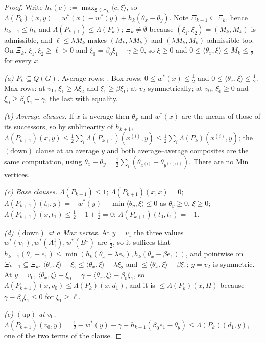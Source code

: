 \documentclass[11pt]{article}
\theoremstyle{plain}
\theoremstyle{definition}
\begin{document}
\begin{proof}
Write $h_k(c):=\max_{\xi\in\Xi_k}\langle c,\xi\rangle$, so
$\Lambda(P_k)(x,y)=w^\ast(x)-w^\ast(y)+h_k(\theta_x-\theta_y)$. Note
$\Xi_{k+1}\subseteq\Xi_k$, hence $h_{k+1}\le h_k$ and
$\Lambda(P_{k+1})\le\Lambda(P_k)$; $\Xi_k\ne\emptyset$ because
$(\xi_1,\xi_2)=(M_k,M_k)$ is admissible, and $\ell\le\lambda M_k$ makes
$(M_k,\lambda M_k)$ and $(\lambda M_k,M_k)$ admissible too. On $\Xi_k$,
$\xi_1,\xi_2\ge\ell>0$ and $\xi_0=\beta_0\xi_1-\gamma\ge0$, so $\xi\ge0$ and
$0\le\langle\theta_x,\xi\rangle\le M_k\le\tfrac12$ for every $x$.

\emph{(a) $P_k\subseteq Q(G)$.} Average rows: . Box rows:
$0\le w^\ast(x)\le\tfrac12$ and $0\le\langle\theta_x,\xi\rangle\le\tfrac12$.
Max rows: at $v_1$, $\xi_1\ge\lambda\xi_2$ and $\xi_1\ge\beta\xi_1$; at $v_2$
symmetrically; at $v_0$, $\xi_0\ge0$ and $\xi_0\ge\beta_0\xi_1-\gamma$, the
last with equality.

\emph{(b) Average clauses.} If $x$ is average then $\theta_x$ and $w^\ast(x)$
are the means of those of its successors, so by sublinearity of $h_{k+1}$,
$\Lambda(P_{k+1})(x,y)\le\tfrac12\sum_i\Lambda(P_{k+1})(x^{(i)},y)
\le\tfrac12\sum_i\Lambda(P_k)(x^{(i)},y)$; the $(\mathrm{down})$ clause at an
average $y$ and both average--average composites are the same computation,
using $\theta_x-\theta_y=\tfrac12\sum_i(\theta_{x^{(i)}}-\theta_{y^{(\pi(i))}})$.
There are no Min vertices.

\emph{(c) Base clauses.} $\Lambda(P_{k+1})\le1$;
$\Lambda(P_{k+1})(x,x)=0$;
$\Lambda(P_{k+1})(t_0,y)=-w^\ast(y)-\min\langle\theta_y,\xi\rangle\le0$ as
$\theta_y\ge0$, $\xi\ge0$; $\Lambda(P_{k+1})(x,t_1)\le\tfrac12-1+\tfrac12=0$;
$\Lambda(P_{k+1})(t_0,t_1)=-1$.

\emph{(d) $(\mathrm{down})$ at a Max vertex.} At $y=v_1$ the three values
$w^\ast(v_1),w^\ast(A^{1}_1),w^\ast(B^{1}_1)$ are $\tfrac12$, so it suffices
that $h_{k+1}(\theta_x-e_1)\le\min(h_k(\theta_x-\lambda e_2),
h_k(\theta_x-\beta e_1))$, and pointwise on $\Xi_{k+1}\subseteq\Xi_k$,
$\langle\theta_x,\xi\rangle-\xi_1\le\langle\theta_x,\xi\rangle-\lambda\xi_2$
and $\le\langle\theta_x,\xi\rangle-\beta\xi_1$; $y=v_2$ is symmetric. At
$y=v_0$, $\langle\theta_x,\xi\rangle-\xi_0=\gamma+\langle\theta_x,\xi\rangle
-\beta_0\xi_1$, so $\Lambda(P_{k+1})(x,v_0)\le\Lambda(P_k)(x,d_1)$, and it is
$\le\Lambda(P_k)(x,H)$ because $\gamma-\beta_0\xi_1\le0$ for $\xi_1\ge\ell$.

\emph{(e) $(\mathrm{up})$ at $v_0$.} $\Lambda(P_{k+1})(v_0,y)
=\tfrac12-w^\ast(y)-\gamma+h_{k+1}(\beta_0e_1-\theta_y)\le\Lambda(P_k)(d_1,y)$,
one of the two terms of the clause.


\end{proof}
\end{document}
